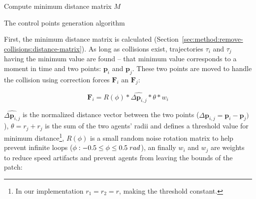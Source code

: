 

\begin{algorithm}[t]
Compute minimum distance matrix $M$\;
\caption{The control points generation algorithm}
\label{algo:control-points}
\end{algorithm}





First, the minimum distance matrix is calculated (Section~\ref{sec:method:remove-collisions:distance-matrix}).
As long as collisions exist, trajectories $\tau_i$ and $\tau_j$ having the minimum value are found -- that minimum value corresponds to a moment in time and two points: $\mathbf{p}_i$ and $\mathbf{p}_j$.
These two points are moved to handle the collision using correction forces $\mathbf{F}_i$ an $\mathbf{F}_j$:

\begin{equation}
	 \mathbf{F}_{i}= R(\phi) * \hat{\Delta{\mathbf{p}_{i, j}}}* \theta * w_i
\end{equation}

$\hat{\Delta{\mathbf{p}_{i, j}}}$ is the normalized distance vector between the two points ($\Delta{\mathbf{p}_{i, j}} = \mathbf{p}_i - \mathbf{p}_j)$),
$\theta = r_j + r_j$ is the sum of the two agents' radii and defines a threshold value for minimum distance\footnote{In our implementation $r_1 = r_2 = r$, making the threshold constant.},
$R(\phi)$ is a small random noise rotation matrix to help prevent infinite loops ($\phi: -0.5 \le \phi \le 0.5 \hspace{0.1cm} rad$),
an finally $w_i$ and $w_j$ are weights to reduce speed artifacts and prevent agents from leaving the bounds of the patch:


